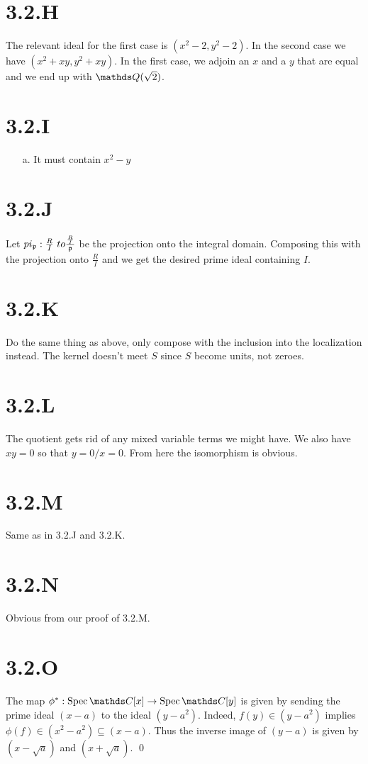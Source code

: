 \documentclass{article}
\begin{document}
\section{3.2.H}
The relevant ideal for the first case is $(x^2-2, y^2-2)$. In the second case we have $(x^2+xy,y^2+xy)$. In the first case, we adjoin an $x$ and a $y$ that are equal and we end up with $\Q(\sqrt{2})$.

\section{3.2.I}
\begin{itemize}
    \item[a.] It must contain $x^2-y$
\end{itemize}

\section{3.2.J}
Let $pi_{\mathfrak{p}} : \frac{R}{I} \ to \frac{\frac{R}{I}}{\mathfrak{p}}$ be the projection onto the integral domain. Composing this with the projection onto $\frac{R}{I}$ and we get the desired prime ideal containing $I$.

\section{3.2.K}
Do the same thing as above, only compose with the inclusion into the localization instead. The kernel doesn't meet $S$ since $S$ become units, not zeroes.

\section{3.2.L}
The quotient gets rid of any mixed variable terms we might have. We also have $xy=0$ so that $y=0/x=0$. From here the isomorphism is obvious.

\section{3.2.M}
Same as in 3.2.J and 3.2.K.

\section{3.2.N}
Obvious from our proof of 3.2.M.

\section{3.2.O}
The map $\phi^* : \Spec\C[x] \to \Spec\C[y]$ is given by sending the prime ideal $(x-a)$ to the ideal $(y-a^2)$. Indeed, $f(y) \in (y-a^2)$ implies $\phi(f) \in (x^2-a^2) \subseteq (x-a)$. Thus the inverse image of $(y-a)$ is given by $(x-\sqrt{a})$ and $(x+\sqrt{a})$. \qed
\end{document}
